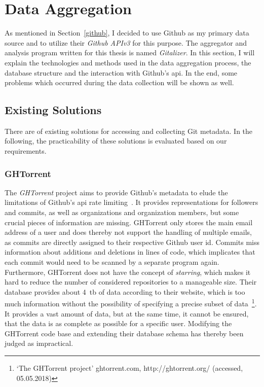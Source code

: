 \section{Data Aggregation}\label{aggregator}
As mentioned in Section~\ref{github}, I decided to use Github as my primary data source and to utilize their \emph{Github APIv3} for this purpose.
The aggregator and analysis program written for this thesis is named \emph{Gitalizer}.
In this section, I will explain the technologies and methods used in the data aggregation process, the database structure and the interaction with Github's \ac{api}.
In the end, some problems which occurred during the data collection will be shown as well.


\subsection{Existing Solutions}
There are of existing solutions for accessing and collecting Git metadata.
In the following, the practicability of these solutions is evaluated based on our requirements.

\subsubsection{GHTorrent}
The \emph{GHTorrent} project aims to provide Github's metadata to elude the limitations of Github's \ac{api} rate limiting~\cite{inproceedings:ghtorrent}.
It provides representations for followers and commits, as well as organizations and organization members, but some crucial pieces of information are missing.
GHTorrent only stores the main email address of a user and does thereby not support the handling of multiple emails, as commits are directly assigned to their respective Github user id.
Commits miss information about additions and deletions in lines of code, which implicates that each commit would need to be scanned by a separate program again.
Furthermore, GHTorrent does not have the concept of \emph{starring}, which makes it hard to reduce the number of considered repositories to a manageable size.
Their database provides about 4~\ac{tb} of data according to their website, which is too much information without the possibility of specifying a precise subset of data~\footnote{`The GHTorrent project' ghtorrent.com, http://ghtorrent.org/ (accessed, 05.05.2018)}.
It provides a vast amount of data, but at the same time, it cannot be ensured, that the data is as complete as possible for a specific user.
Modifying the GHTorrent code base and extending their database schema has thereby been judged as impractical.

